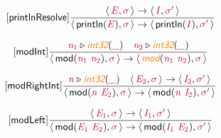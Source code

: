\documentclass[10pt,leqno,fleqn]{article}
\newcommand{\artVariable}[1]{\mbox{\color{purple}\em #1\/}}
\newcommand{\artConstructor}[1]{\mbox{\sf #1}}
\newcommand{\artSpecial}[1]{\mbox{\color{orange}\sf\em #1}}
\begin{document}
\begin{equation}
\tag*{[\artConstructor{\sf printlnResolve}]}
\begin{split}\frac{\langle\, \artVariable{E}, \artVariable{$\sigma$}\,\rangle \rightarrow \langle\, \artVariable{I}, \artVariable{$\sigma$\/$^\prime$}\,\rangle }{\langle\, \artConstructor{\sf println}(\artVariable{E}), \artVariable{$\sigma$}\,\rangle \rightarrow \langle\, \artConstructor{\sf println}(\artVariable{I}), \artVariable{$\sigma$\/$^\prime$}\,\rangle }
\end{split}
\end{equation}

\begin{equation}
\tag*{[\artConstructor{\sf modInt}]}
\begin{split}\frac{ \artVariable{n$_{1}$}\triangleright \artSpecial{int32}(\_) \quad  \artVariable{n$_{2}$}\triangleright \artSpecial{int32}(\_) }{\langle\, \artConstructor{\sf mod}(\artVariable{n$_{1}$}\ \artVariable{n$_{2}$}), \artVariable{$\sigma$}\,\rangle \rightarrow \langle\, \artSpecial{mod}(\artVariable{n$_{1}$}\ \artVariable{n$_{2}$}), \artVariable{$\sigma$}\,\rangle }
\end{split}
\end{equation}

\begin{equation}
\tag*{[\artConstructor{\sf modRightInt}]}
\begin{split}\frac{ \artVariable{n}\triangleright \artSpecial{int32}(\_) \quad \langle\, \artVariable{E$_{2}$}, \artVariable{$\sigma$}\,\rangle \rightarrow \langle\, \artVariable{I$_{2}$}, \artVariable{$\sigma$\/$^\prime$}\,\rangle }{\langle\, \artConstructor{\sf mod}(\artVariable{n}\ \artVariable{E$_{2}$}), \artVariable{$\sigma$}\,\rangle \rightarrow \langle\, \artConstructor{\sf mod}(\artVariable{n}\ \artVariable{I$_{2}$}), \artVariable{$\sigma$\/$^\prime$}\,\rangle }
\end{split}
\end{equation}

\begin{equation}
\tag*{[\artConstructor{\sf modLeft}]}
\begin{split}\frac{\langle\, \artVariable{E$_{1}$}, \artVariable{$\sigma$}\,\rangle \rightarrow \langle\, \artVariable{I$_{1}$}, \artVariable{$\sigma$\/$^\prime$}\,\rangle }{\langle\, \artConstructor{\sf mod}(\artVariable{E$_{1}$}\ \artVariable{E$_{2}$}), \artVariable{$\sigma$}\,\rangle \rightarrow \langle\, \artConstructor{\sf mod}(\artVariable{I$_{1}$}\ \artVariable{E$_{2}$}), \artVariable{$\sigma$\/$^\prime$}\,\rangle }
\end{split}
\end{equation}
\end{document}
